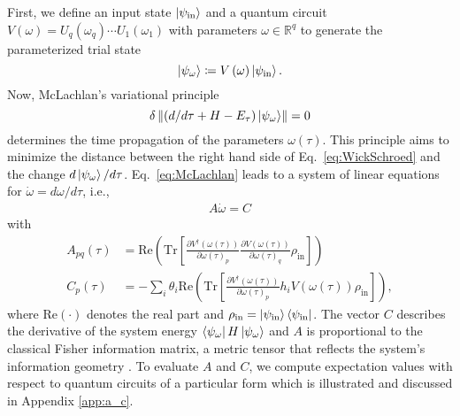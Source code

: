 \documentclass[twocolumn, aps, pra, superscriptaddress, floatfix]{revtex4}
\begin{document}
First, we define an input state $\ket{\psi_{\text{in}}}$ and a quantum circuit $V\left(\omega\right) = U_q\left(\omega_q\right)\cdots U_1\left(\omega_1\right)$ with parameters $\omega \in \mathbb{R}^{q}$ to generate the parameterized trial state
\begin{equation*}
\label{eq:varSite}
\ket{\psi_{\omega}} \coloneqq V\left(\omega\right)\ket{\psi_{\text{in}}}.
\end{equation*}
Now, McLachlan's variational principle 
\begin{equation}
\label{eq:McLachlan}
	\delta  \left\lVert \left(d/d\tau + H - E_{\tau}\right) \ket{ \psi_{\omega}} \right\rVert = 0
\end{equation}
determines the time propagation of the parameters $\omega(\tau)$.
This principle aims to minimize the distance between the right hand side of Eq.~\eqref{eq:WickSchroed} and the change $d\ket{ \psi_{\omega}} / d \tau$.
Eq.~\eqref{eq:McLachlan} leads to a system of linear equations for  $\dot{\omega}= d \omega / d\tau$, i.e., 
\begin{align}
\label{eq:sle}
A\dot{\omega} = C
\end{align}
with
\begin{equation}
\begin{split}
\label{eq:AC}
A_{pq}\left(\tau\right) &= \text{Re}\left(\text{Tr}\left[\frac{\partial V^{\dagger}\left(\omega\left(\tau\right)\right)}{\partial\omega\left(\tau\right)_p}\frac{\partial V\left(\omega\left(\tau\right)\right)}{\partial\omega\left(\tau\right)_q}\rho_{\text{in}}\right]\right) \\
C_p\left(\tau\right) &=  -\sum\limits_i\theta_i\text{Re}\left(\text{Tr}\left[\frac{\partial V^{\dagger}\left(\omega\left(\tau\right)\right)}{\partial\omega\left(\tau\right)_p}h_iV\left(\omega\left(\tau\right)\right)\rho_{\text{in}}\right]\right),
\end{split}
\end{equation}
where $\text{Re}\left(\cdot\right)$ denotes the real part and $\rho_{\text{in}} = \ket{\psi_{\text{in}}}\bra{\psi_{\text{in}}}$.
The vector $C$ describes the derivative of the system energy $ \bra{ \psi_{\omega}}H \ket{ \psi_{\omega}}$ and $A$ is proportional to the classical Fisher information matrix, a metric tensor that reflects the system's information geometry \cite{QNGNonUnitary19Simon}.
To evaluate $A$ and $C$, we compute expectation values with respect to quantum circuits of a particular form which is illustrated and discussed in Appendix \ref{app:a_c}. 
\end{document}
